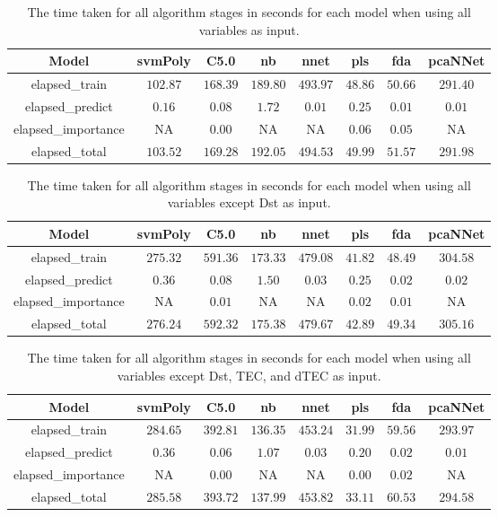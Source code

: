 \begin{table}[!ht]
	\centering
	\begin{tabular}{|c|c|c|c|c|c|c|c|}
		\hline
		Model & svmPoly & C5.0 & nb & nnet & pls & fda & pcaNNet \\ \hline
		elapsed_train & $102.87$ & $168.39$ & $189.80$ & $493.97$ & $48.86$ & $50.66$ & $291.40$ \\ \hline
		elapsed_predict & $0.16$ & $0.08$ & $1.72$ & $0.01$ & $0.25$ & $0.01$ & $0.01$ \\ \hline
		elapsed_importance & NA & $0.00$ & NA & NA & $0.06$ & $0.05$ & NA \\ \hline
		elapsed_total & $103.52$ & $169.28$ & $192.05$ & $494.53$ & $49.99$ & $51.57$ & $291.98$ \\ \hline
	\end{tabular}
	\caption{The time taken for all algorithm stages in seconds for each model when using all variables as input.}
	\label{tab:time:reverse:all}
\end{table}

\begin{table}[!ht]
	\centering
	\begin{tabular}{|c|c|c|c|c|c|c|c|}
		\hline
		Model & svmPoly & C5.0 & nb & nnet & pls & fda & pcaNNet \\ \hline
		elapsed_train & $275.32$ & $591.36$ & $173.33$ & $479.08$ & $41.82$ & $48.49$ & $304.58$ \\ \hline
		elapsed_predict & $0.36$ & $0.08$ & $1.50$ & $0.03$ & $0.25$ & $0.02$ & $0.02$ \\ \hline
		elapsed_importance & NA & $0.01$ & NA & NA & $0.02$ & $0.01$ & NA \\ \hline
		elapsed_total & $276.24$ & $592.32$ & $175.38$ & $479.67$ & $42.89$ & $49.34$ & $305.16$ \\ \hline
	\end{tabular}
	\caption{The time taken for all algorithm stages in seconds for each model when using all variables except Dst as input.}
	\label{tab:time:reverse:noDst}
\end{table}

\begin{table}[!ht]
	\centering
	\begin{tabular}{|c|c|c|c|c|c|c|c|}
		\hline
		Model & svmPoly & C5.0 & nb & nnet & pls & fda & pcaNNet \\ \hline
		elapsed_train & $284.65$ & $392.81$ & $136.35$ & $453.24$ & $31.99$ & $59.56$ & $293.97$ \\ \hline
		elapsed_predict & $0.36$ & $0.06$ & $1.07$ & $0.03$ & $0.20$ & $0.02$ & $0.01$ \\ \hline
		elapsed_importance & NA & $0.00$ & NA & NA & $0.00$ & $0.02$ & NA \\ \hline
		elapsed_total & $285.58$ & $393.72$ & $137.99$ & $453.82$ & $33.11$ & $60.53$ & $294.58$ \\ \hline
	\end{tabular}
	\caption{The time taken for all algorithm stages in seconds for each model when using all variables except Dst, TEC, and dTEC as input.}
	\label{tab:time:reverse:noTEC}
\end{table}

